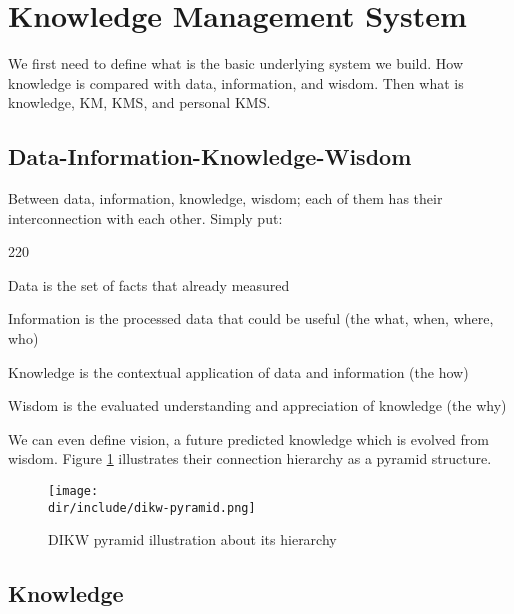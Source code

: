 \section{Knowledge Management System}
\label{sec:kms}

We first need to define what is the basic underlying system we build.
How knowledge is compared with data, information, and wisdom.
Then what is knowledge, \ac{KM}, \ac{KMS}, and personal \ac{KMS}.

\subsection{Data-Information-Knowledge-Wisdom}

Between data, information, knowledge, wisdom; each of them has their interconnection with each other. Simply put:

\begin{dinglist}{220}
\item Data is the set of facts that already measured
\item Information is the processed data that could be useful (the what, when, where, who)
\item Knowledge is the contextual application of data and information (the how)
\item Wisdom is the evaluated understanding and appreciation of knowledge (the why)
\end{dinglist}

We can even define vision, a future predicted knowledge which is evolved from wisdom.
Figure \ref{fig:kms:dikw-pyramid} illustrates their connection hierarchy as a pyramid structure.

\begin{figure}[htbp]
    \centering
    \texttt{[image: \\dir/include/dikw-pyramid.png]}
    \caption[DIKW Pyramid]{DIKW pyramid illustration about its hierarchy}
    \label{fig:kms:dikw-pyramid}
\end{figure}

\subsection{Knowledge}

